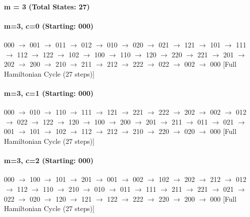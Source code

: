 \paragraph{m = 3 (Total States: 27)}



\paragraph{ m=3, c=0 (Starting: 000)}



000 $\rightarrow$ 001 $\rightarrow$ 011 $\rightarrow$ 012 $\rightarrow$ 010 $\rightarrow$ 020 $\rightarrow$ 021 $\rightarrow$ 121 $\rightarrow$ 101 $\rightarrow$ 111 $\rightarrow$ 112 $\rightarrow$ 122 $\rightarrow$ 102 $\rightarrow$ 100 $\rightarrow$ 110 $\rightarrow$ 120 $\rightarrow$ 220 $\rightarrow$ 221 $\rightarrow$ 201 $\rightarrow$ 202 $\rightarrow$ 200 $\rightarrow$ 210 $\rightarrow$ 211 $\rightarrow$ 212 $\rightarrow$ 222 $\rightarrow$ 022 $\rightarrow$ 002 $\rightarrow$ 000 
[Full Hamiltonian Cycle (27 steps)]


\paragraph{ m=3, c=1 (Starting: 000)}



000 $\rightarrow$ 010 $\rightarrow$ 110 $\rightarrow$ 111 $\rightarrow$ 121 $\rightarrow$ 221 $\rightarrow$ 222 $\rightarrow$ 202 $\rightarrow$ 002 $\rightarrow$ 012 $\rightarrow$ 022 $\rightarrow$ 122 $\rightarrow$ 120 $\rightarrow$ 100 $\rightarrow$ 200 $\rightarrow$ 201 $\rightarrow$ 211 $\rightarrow$ 011 $\rightarrow$ 021 $\rightarrow$ 001 $\rightarrow$ 101 $\rightarrow$ 102 $\rightarrow$ 112 $\rightarrow$ 212 $\rightarrow$ 210 $\rightarrow$ 220 $\rightarrow$ 020 $\rightarrow$ 000 
[Full Hamiltonian Cycle (27 steps)]


\paragraph{ m=3, c=2 (Starting: 000)}



000 $\rightarrow$ 100 $\rightarrow$ 101 $\rightarrow$ 201 $\rightarrow$ 001 $\rightarrow$ 002 $\rightarrow$ 102 $\rightarrow$ 202 $\rightarrow$ 212 $\rightarrow$ 012 $\rightarrow$ 112 $\rightarrow$ 110 $\rightarrow$ 210 $\rightarrow$ 010 $\rightarrow$ 011 $\rightarrow$ 111 $\rightarrow$ 211 $\rightarrow$ 221 $\rightarrow$ 021 $\rightarrow$ 022 $\rightarrow$ 020 $\rightarrow$ 120 $\rightarrow$ 121 $\rightarrow$ 122 $\rightarrow$ 222 $\rightarrow$ 220 $\rightarrow$ 200 $\rightarrow$ 000 
[Full Hamiltonian Cycle (27 steps)]


